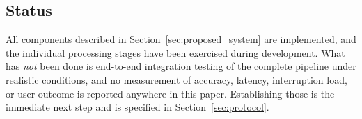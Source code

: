 \subsection{Status}

All components described in Section~\ref{sec:proposed_system} are implemented, and the individual
processing stages have been exercised during development. What has \emph{not} been done is
end-to-end integration testing of the complete pipeline under realistic conditions, and no
measurement of accuracy, latency, interruption load, or user outcome is reported anywhere in this
paper. Establishing those is the immediate next step and is specified in Section~\ref{sec:protocol}.
